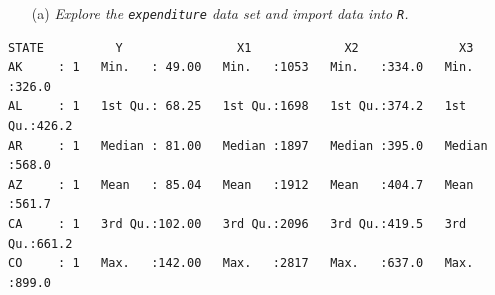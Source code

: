 \documentclass[12pt,letterpaper]{article}
\begin{document}
\vspace{.25cm}
\begin{itemize}
\item [(a)] \emph{Explore the \texttt{expenditure} data set and import data into \texttt{R}.}
\end{itemize}
\vspace{.5cm}
  
\newpage

\begin{verbatim}
STATE          Y                X1             X2              X3       
AK     : 1   Min.   : 49.00   Min.   :1053   Min.   :334.0   Min.   :326.0  
AL     : 1   1st Qu.: 68.25   1st Qu.:1698   1st Qu.:374.2   1st Qu.:426.2  
AR     : 1   Median : 81.00   Median :1897   Median :395.0   Median :568.0  
AZ     : 1   Mean   : 85.04   Mean   :1912   Mean   :404.7   Mean   :561.7  
CA     : 1   3rd Qu.:102.00   3rd Qu.:2096   3rd Qu.:419.5   3rd Qu.:661.2  
CO     : 1   Max.   :142.00   Max.   :2817   Max.   :637.0   Max.   :899.0  
\end{verbatim}
\vspace{.5cm}
\end{document}
